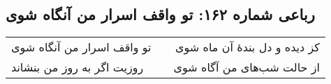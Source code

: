 \begin{center}
\section*{رباعی شماره ۱۶۲: تو واقف اسرار من آنگاه شوی}
\label{sec:162}
\begin{longtable}{l p{0.5cm} r}
تو واقف اسرار من آنگاه شوی
&&
کز دیده و دل بندهٔ آن ماه شوی
\\
روزیت اگر به روز من بنشاند
&&
از حالت شب‌های من آگاه شوی
\\
\end{longtable}
\end{center}
